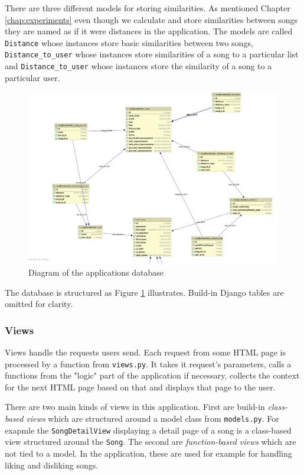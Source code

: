 There are three different models for storing similarities. As mentioned Chapter \ref{chap:experiments} even though we calculate and store similarities between songs they are named as if it were distances in the application. The models are called \texttt{Distance} whose instances store basic similarities between two songs, \texttt{Distance\_to\_user} whose instances store similarities of a song to a particular list and \texttt{Distance\_to\_user} whose instances store the similarity of a song to a particular user. 
\begin{figure}[ht]
    \centering
	\includegraphics[width=120mm]{./img/postgres_databaze.png}
	\caption{Diagram of the applications database}
	\label{fig:diagram}
\end{figure}
The database is structured as Figure \ref{fig:diagram} illustrates. Build-in Django tables are omitted for clarity.

\subsubsection{Views}
Views handle the requests users send. Each request from some HTML page is processed by a function from \texttt{views.py}. It takes it request's parameters, calls a functions from the "logic" part of the application if necessary, collects the context for the next HTML page based on that and displays that page to the user. 

There are two main kinds of views in this application. First are build-in \textit{class-based views} which are structured around a model class from \texttt{models.py}. For exapmle the \texttt{SongDetailView} displaying a detail page of a song is a class-based view structured around the \texttt{Song}. The second are \textit{function-based views} which are not tied to a model. In the application, these are used for example for handling liking and disliking songs. 

